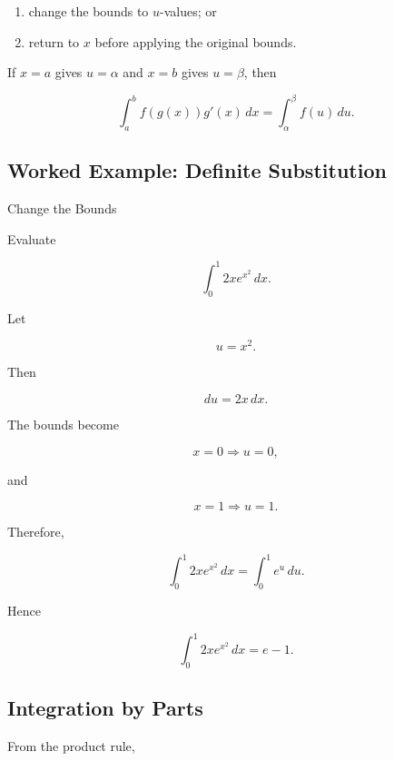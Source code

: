\begin{enumerate}
    \item change the bounds to \(u\)-values; or
    \item return to \(x\) before applying the original bounds.
\end{enumerate}

If \(x=a\) gives \(u=\alpha\) and \(x=b\) gives \(u=\beta\), then

\[
\boxed{
\int_a^b
f(g(x))g'(x)\,dx
=
\int_\alpha^\beta
f(u)\,du.
}
\]

\subsection{Worked Example: Definite Substitution}
\label{subsec:worked-definite-substitution}

\begin{workedexamplebox}{Change the Bounds}

Evaluate

\[
\int_0^1
2x e^{x^2}
\,dx.
\]

Let

\[
u=x^2.
\]

Then

\[
du=2x\,dx.
\]

The bounds become

\[
x=0
\Rightarrow
u=0,
\]

and

\[
x=1
\Rightarrow
u=1.
\]

Therefore,

\[
\int_0^1
2xe^{x^2}\,dx
=
\int_0^1
e^u\,du.
\]

Hence

\begin{answerbox}
\[
\boxed{
\int_0^1
2xe^{x^2}\,dx
=
e-1.
}
\]
\end{answerbox}

\end{workedexamplebox}

\subsection{Integration by Parts}
\label{subsec:integration-by-parts-reference}

From the product rule,

